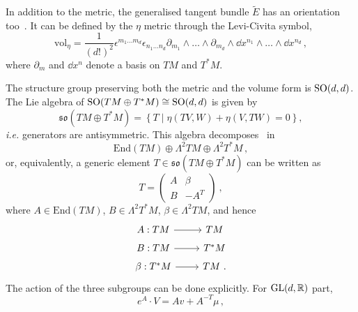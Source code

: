 \documentclass[debug]{phd}
\begin{document}
					In addition to the metric, the generalised tangent bundle $\tilde{E}$ has an orientation too~\cite{gualtphd}.
					It can be defined by the $\eta$ metric through the Levi-Civita symbol,
							\begin{equation}
								\mathrm{vol}_\eta = \frac{1}{(d!)^2} \epsilon^{m_1 \ldots m_d} \epsilon_{n_1 \ldots n_d} \partial_{m_1} \wedge \ldots \wedge \partial_{m_d} \wedge \dd x^{n_1} \wedge \ldots \wedge \dd x^{n_d} \, ,
							\end{equation}
							where $\partial_{m}$ and $ \dd x^{n}$ denote a basis on $TM$ and $T^*M$. 

					The structure group preserving both the metric and the volume form is $\mathrm{SO}(d,d)$.
					The Lie algebra of $\mathrm{SO}(TM \oplus T^{*}M) \cong \mathrm{SO}(d,d)$ is given by 
							\begin{equation}\label{soalg}
								\mathfrak{so}(TM \oplus T^{*}M) = \left\{ T \mid \eta( TV , W) + \eta( V , TW ) = 0 \right\},
							\end{equation}
					\textit{i.e.} generators are antisymmetric. 
					This algebra decomposes~\cite{KoerberReview} in 
							\begin{equation}\label{sodec}
								\mathrm{End}(TM) \oplus \Lambda^2 TM \oplus \Lambda^2 T^*M \, ,
							\end{equation} 
					or, equivalently, a generic element $T \in \mathfrak{so}(TM \oplus T^{*}M)$ can be written as
							\begin{equation}\label{Bbeta}
								T = \begin{pmatrix} A & \beta \\ B & -A^{T} \end{pmatrix}\ ,
							\end{equation}
					where $A \in \mathrm{End}(TM)$, $B \in \Lambda^2 T^*M$, $\beta \in \Lambda^2 TM$, and hence
							\begin{equation*}
								\begin{tikzcd}[row sep=tiny]
									A : TM \arrow{r} & TM \\
									B : TM \arrow{r} & T^*M \\
									\beta : T^*M \arrow{r} & TM\ .
								\end{tikzcd}
							\end{equation*}
					The action of the three subgroups can be done explicitly.
					For $\mathrm{GL}(d,\mathbb{R})$ part,
							\begin{equation}
								e^A \cdot V = A v + A^{-T} \mu \, , 
							\end{equation}
\end{document}
